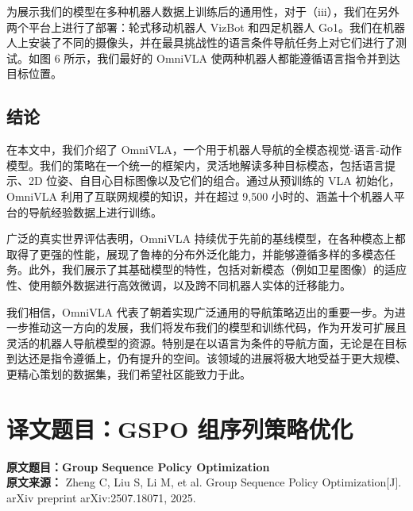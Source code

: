 为展示我们的模型在多种机器人数据上训练后的通用性，对于（iii），我们在另外两个平台上进行了部署：轮式移动机器人 VizBot 和四足机器人 Go1。我们在机器人上安装了不同的摄像头，并在最具挑战性的语言条件导航任务上对它们进行了测试。如图 6 所示，我们最好的 OmniVLA 使两种机器人都能遵循语言指令并到达目标位置。

\subsection{结论}

在本文中，我们介绍了 OmniVLA，一个用于机器人导航的全模态视觉-语言-动作模型。我们的策略在一个统一的框架内，灵活地解读多种目标模态，包括语言提示、2D 位姿、自目心目标图像以及它们的组合。通过从预训练的 VLA 初始化，OmniVLA 利用了互联网规模的知识，并在超过 9,500 小时的、涵盖十个机器人平台的导航经验数据上进行训练。

广泛的真实世界评估表明，OmniVLA 持续优于先前的基线模型，在各种模态上都取得了更强的性能，展现了鲁棒的分布外泛化能力，并能够遵循多样的多模态任务。此外，我们展示了其基础模型的特性，包括对新模态（例如卫星图像）的适应性、使用额外数据进行高效微调，以及跨不同机器人实体的迁移能力。

我们相信，OmniVLA 代表了朝着实现广泛通用的导航策略迈出的重要一步。为进一步推动这一方向的发展，我们将发布我们的模型和训练代码，作为开发可扩展且灵活的机器人导航模型的资源。特别是在以语言为条件的导航方面，无论是在目标到达还是指令遵循上，仍有提升的空间。该领域的进展将极大地受益于更大规模、更精心策划的数据集，我们希望社区能致力于此。




\section*{译文题目：GSPO 组序列策略优化}
{
\noindent \textbf{原文题目：Group Sequence Policy Optimization} \\
\textbf{原文来源：} Zheng C, Liu S, Li M, et al. Group Sequence Policy Optimization[J]. arXiv preprint arXiv:2507.18071, 2025. \\
}

\vskip 5mm

 {
\setlength{\baselineskip}{16pt}}


